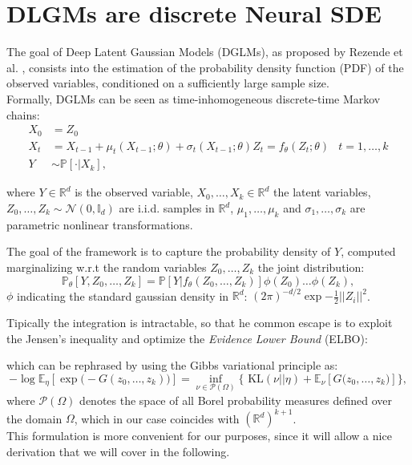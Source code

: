 \documentclass[11pt]{article}
\begin{document}
\section{DLGMs are discrete Neural SDE}
\label{sec:dglm}
The goal of Deep Latent Gaussian Models (DGLMs), as proposed by Rezende et al. \cite{rezende2014stochastic}, consists into the estimation of the probability density function (PDF) of the observed variables, conditioned on a sufficiently large sample size. \\ 
Formally, DGLMs can be seen as time-inhomogeneous discrete-time Markov chains:
\begin{align}
  X_0 &= Z_0 \\ 
  X_t &= X_{t-1} + \mu_t(X_{t-1}; \theta) + \sigma_t(X_{t-1}; \theta)Z_t = f_\theta(Z_t; \theta)   & t = 1, \dots, k \\ 
  Y & \sim \mathbb{P}[ \cdot | X_k],
\end{align}

where $Y \in \mathbb{R}^d $ is the observed variable, $X_0, \dots, X_k \in \mathbb{R}^d$ the latent variables, $Z_0, \dots, Z_k \sim \mathcal{N}(0, \mathbb{I}_d)$ are i.i.d. samples in $\mathbb{R}^d$, $\mu_1, \dots, \mu_k$ and $\sigma_1, \dots, \sigma_k$ are parametric nonlinear transformations. 

The goal of the framework is to capture the probability density of $Y$, computed marginalizing w.r.t the random variables $Z_0, \dots, Z_k$ the joint distribution:
\begin{equation}
  \mathbb{P}_{\theta} [Y, Z_0, \dots, Z_k] = \mathbb{P}[Y | f_\theta(Z_0, \dots, Z_k)]\phi(Z_0)\dots\phi(Z_k), \label{eq:dglm-vi-discrete}
\end{equation}
$\phi$ indicating the standard gaussian density in $\mathbb{R}^d$: $(2\pi)^{-d/2}\exp{-\frac{1}{2}||Z_i||^2} $. 

Tipically the integration is intractable, so that he common escape is to exploit the Jensen's inequality and optimize the \textit{Evidence Lower Bound} (ELBO):


which can be rephrased by using the Gibbs variational principle \cite{dupuis1997weak}
as:
\begin{equation}
  - \log \mathbb{E}_\eta[\exp\big(-G(z_0, \dots, z_k)\big)] = \inf_{\nu \in \mathcal{P}(\Omega)} \{\text{ KL}(\nu || \eta) + \mathbb{E}_\nu[G\big(z_0, \dots, z_k \big)] \}, \label{eq:dlgm-elbo-gibbs}
\end{equation}
where $\mathcal{P}(\Omega)$ denotes the space of all Borel probability measures defined over the domain $\Omega$, which in our case coincides with $(\mathbb{R}^{d})^{k+1}$. \\ 
This formulation is more convenient for our purposes, since it will allow a nice  derivation that we will cover in the following. \\ 
\end{document}
